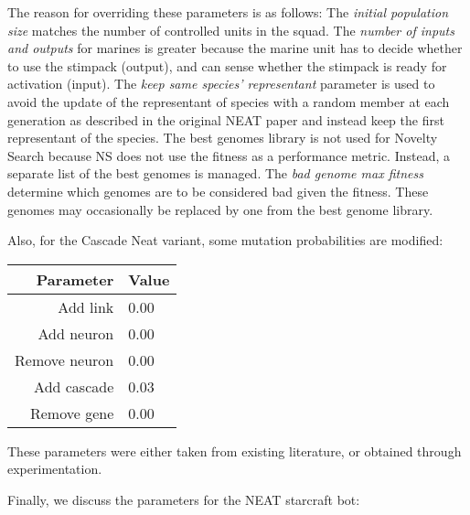 The reason for overriding these parameters is as follows: The
\emph{initial population size} matches the number of controlled units
in the squad.  The \emph{number of inputs and outputs} for marines is
greater because the marine unit has to decide whether to use the
stimpack (output), and can sense whether the stimpack is ready for
activation (input). The \emph{keep same species' representant}
parameter is used to avoid the update of the representant of species
with a random member at each generation as described in the original
NEAT paper and instead keep the first representant of the species. The
best genomes library is not used for Novelty Search because NS does
not use the fitness as a performance metric. Instead, a separate list
of the best genomes is managed. The \emph{bad genome max fitness}
determine which genomes are to be considered bad given the
fitness. These genomes may occasionally be replaced by one from the
best genome library.


Also, for the Cascade Neat variant, some mutation probabilities are modified:

\begin{tabular}{rl}
    \toprule
    Parameter & Value \\
    \midrule
    Add link & 0.00 \\
    Add neuron & 0.00 \\
    Remove neuron & 0.00 \\
    Add cascade & 0.03 \\
    Remove gene & 0.00 \\
    \bottomrule
\end{tabular}

These parameters were either taken from existing literature, or
obtained through experimentation.


Finally, we discuss the parameters for the NEAT starcraft bot:

